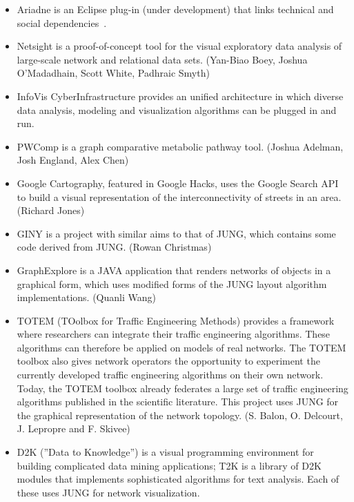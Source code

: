 \begin{enumerate}
\begin{itemize}
\item Ariadne is an Eclipse plug-in (under development) that links technical and social dependencies~\cite{ARIADNE}.

\item Netsight is a proof-of-concept tool for the visual exploratory data analysis of large-scale network and relational data sets. (Yan-Biao Boey, Joshua O'Madadhain, Scott White, Padhraic Smyth)~\cite{NETSIGHT}

\item InfoVis CyberInfrastructure provides an unified architecture in which diverse data analysis, modeling and visualization algorithms can be plugged in and run.~\cite{INFOVIS_CYBERINFRASTRUCTURE}

\item PWComp is a graph comparative metabolic pathway tool. (Joshua Adelman, Josh England, Alex Chen)~\cite{PWCOMP}

\item Google Cartography, featured in Google Hacks, uses the Google Search API to build a visual representation of the interconnectivity of streets in an area. (Richard Jones)~\cite{GOOGLE_CARTOGRAPHY}

\item GINY is a project with similar aims to that of JUNG, which contains some code derived from JUNG. (Rowan Christmas)~\cite{GINY}

\item GraphExplore is a JAVA application that renders networks of objects in a graphical form, which uses modified forms of the JUNG layout algorithm implementations. (Quanli Wang)~\cite{GRAPHEXPLORER}

\item TOTEM (TOolbox for Traffic Engineering Methods) provides a framework where researchers can integrate their traffic engineering algorithms. These algorithms can therefore be applied on models of real networks. The TOTEM toolbox also gives network operators the opportunity to experiment the currently developed traffic engineering algorithms on their own network. Today, the TOTEM toolbox already federates a large set of traffic engineering algorithms published in the scientific literature. This project uses JUNG for the graphical representation of the network topology. (S. Balon, O. Delcourt, J. Lepropre and F. Skivee)~\cite{TOTEM}

\item D2K (''Data to Knowledge'') is a visual programming environment for building complicated data mining applications; T2K is a library of D2K modules that implements sophisticated algorithms for text analysis. Each of these uses JUNG for network visualization.~\cite{D2K}


\end{itemize}
\end{enumerate}
